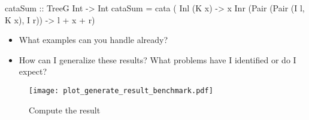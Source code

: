 \begin{haskell}
cataSum :: TreeG Int -> Int
cataSum = cata (\case
  Inl (K x)                         -> x
  Inr (Pair (Pair (I l, K x), I r)) -> l + x + r)
\end{haskell}

\begin{itemize}
  \item What examples can you handle already?
  \item How can I generalize these results? What problems have I identified or do I expect?
\end{itemize}

\begin{figure}[H]
  \centering

  \texttt{[image: plot\_generate\_result\_benchmark.pdf]}
  \caption{Compute the result}
  \label{fig-compute-result}
\end{figure}
